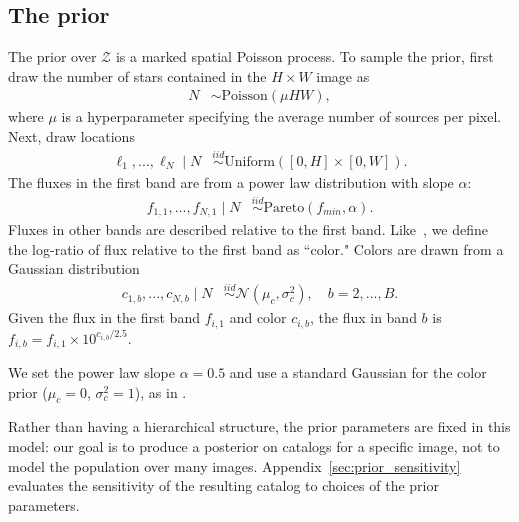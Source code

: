\subsection{The prior}
The prior over $\mathcal{Z}$ is a marked spatial Poisson process. To sample the prior, first draw the number of stars contained in the $H\times W$ image as
\begin{align}
	N &\sim \text{Poisson}(\mu HW),
	\label{eq:n_prior}
\end{align}
where $\mu$ is a hyperparameter specifying the average number of sources per pixel.
Next, draw locations
\begin{align}
  \ell_1, ..., \ell_N \mid N &\stackrel{iid}{\sim} \text{Uniform}([0, H] \times [0, W]).
 \end{align}
The fluxes in the first band are from a power law distribution with slope $\alpha$:
\begin{align}
    f_{1, 1}, ..., f_{N,1} \mid N &
    \stackrel{iid}{\sim} \text{Pareto}(f_{min}, \alpha)
    \label{eq:flux_prior}.
\end{align}
Fluxes in other bands are described relative to the first band. Like~\cite{Feder_2019}, we define the log-ratio of flux relative to the first band as ``color." Colors are drawn from a Gaussian distribution
\begin{align}
  c_{1, b}, ..., c_{N,b} \mid N  &
      \stackrel{iid}{\sim} \mathcal{N}(\mu_c, \sigma^2_c), \quad b = 2, ..., B.
\end{align}
Given the flux in the first band $f_{i,1}$ and color $c_{i,b}$,
the flux in band $b$ is  $f_{i,b} = f_{i,1} \times 10^{c_{i,b} / 2.5}$.

We set the power law slope $\alpha = 0.5$ and use a standard Gaussian for the color prior ($\mu_c = 0$, $\sigma^2_c = 1$), as in \cite{Feder_2019}.

Rather than having a hierarchical structure, 
the prior parameters are fixed in this model:
our goal is to produce a posterior on catalogs for a
specific image, not to model the population over many images. 
Appendix~\ref{sec:prior_sensitivity} evaluates the
sensitivity of the resulting catalog to choices of the prior parameters.


